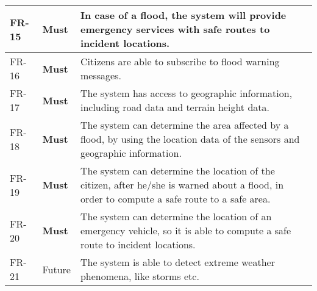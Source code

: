 \begin{longtable}{p{} p{} p{}}
	\hline {} \label{fr:15} FR-15 & 
      \textbf{Must} &
     In case of a flood, the system will provide emergency services with safe routes to incident locations. \\
    
    \hline {} \label{fr:16} FR-16 & 
      \textbf{Must} &
     Citizens are able to subscribe to flood warning messages. \\
    
    \hline {} \label{fr:17} FR-17 & 
      \textbf{Must} &
     The system has access to geographic information, including road data and terrain height data. \\
    
    \hline {} \label{fr:18} FR-18 & 
      \textbf{Must} &
     The system can determine the area affected by a flood, by using the location data of the sensors and geographic information. \\
    
    \hline {} \label{fr:19} FR-19 & 
      \textbf{Must} &
     The system can determine the location of the citizen, after he/she is warned about a flood, in order to compute a safe route to a safe area. \\
    
    \hline {} \label{fr:20} FR-20 & 
      \textbf{Must} &
     The system can determine the location of an emergency vehicle, so it is able to compute a safe route to incident locations. \\
    
    
	
    \hline {} \label{fr:21} FR-21 & 
      Future &
     The system is able to detect extreme weather phenomena, like storms etc. \\
\end{longtable}